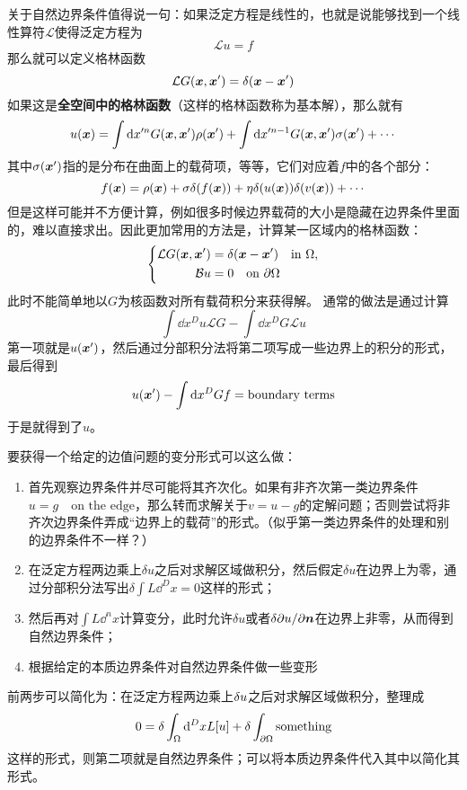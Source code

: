 \documentclass[UTF8]{ctexart}
\begin{document}
关于自然边界条件值得说一句：如果泛定方程是线性的，也就是说能够找到一个线性算符$\mathcal{L}$使得泛定方程为
\[
    \mathcal{L} u = f
\]
那么就可以定义格林函数
\[
    \mathcal{L} G(\vb*{x}, \vb*{x}') = \delta(\vb*{x} - \vb*{x}')
\]
如果这是\textbf{全空间中的格林函数}（这样的格林函数称为基本解），那么就有
\[
    u(\vb*{x}) = \int \dd x'^n G(\vb*{x}, \vb*{x}') \rho(\vb*{x}') + \int \dd x'^{n-1} G(\vb*{x}, \vb*{x}') \sigma(\vb*{x}') + \cdots
\]
其中$\sigma(\vb*{x}')$指的是分布在曲面上的载荷项，等等，它们对应着$f$中的各个部分：
\[
    f(\vb*{x}) = \rho(\vb*{x}) + \sigma \delta (f(\vb*{x})) + \eta \delta(u(\vb*{x})) \delta(v(\vb*{x})) + \cdots
\]
但是这样可能并不方便计算，例如很多时候边界载荷的大小是隐藏在边界条件里面的，难以直接求出。因此更加常用的方法是，计算某一区域内的格林函数：
\begin{equation}
    \left\{
        \begin{aligned}
            \mathcal{L} G(\vb*{x}, \vb*{x}'
            ) &= \delta(\vb*{x} - \vb*{x}') \quad \text{in $\Omega$}, \\
            \mathcal{B} u &= 0 \quad \text{on $\partial \Omega$}
        \end{aligned}
    \right.
\end{equation}
此时不能简单地以$G$为核函数对所有载荷积分来获得解。
通常的做法是通过计算
\[
    \int \dd x^D u \mathcal{L} G - \int \dd x^D G \mathcal{L} u
\]
第一项就是$u(\vb*{x}')$，然后通过分部积分法将第二项写成一些边界上的积分的形式，最后得到
\[
    u(\vb*{x}') - \int \dd x^D G f = \text{boundary terms}
\]
于是就得到了$u$。

要获得一个给定的边值问题的变分形式可以这么做：
\begin{enumerate}
    \item 首先观察边界条件并尽可能将其齐次化。如果有非齐次第一类边界条件$u=g \quad \text{on the edge}$，那么转而求解关于$v=u-g$的定解问题；否则尝试将非齐次边界条件弄成“边界上的载荷”的形式。（似乎第一类边界条件的处理和别的边界条件不一样？）
    \item 在泛定方程两边乘上$\delta u$之后对求解区域做积分，然后假定$\delta u$在边界上为零，通过分部积分法写出$\delta \int L \dd^D x = 0$这样的形式；
    \item 然后再对$\int L \dd^n x$计算变分，此时允许$\delta u$或者$\var{\partial u / \partial \vb*{n}}$在边界上非零，从而得到自然边界条件；
    \item 根据给定的本质边界条件对自然边界条件做一些变形
\end{enumerate}
前两步可以简化为：在泛定方程两边乘上$\var{u}$之后对求解区域做积分，整理成
\begin{equation}
    0 = \var{\int_\Omega \dd^D x L[u]} + \var{\int_{\partial \Omega} \text{something}}
\end{equation}
这样的形式，则第二项就是自然边界条件；可以将本质边界条件代入其中以简化其形式。
\end{document}
